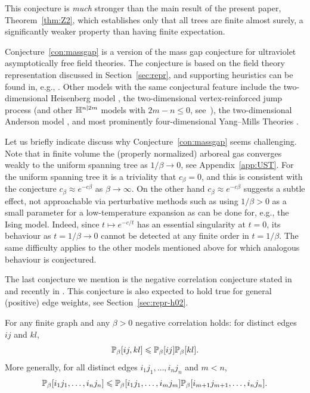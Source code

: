 \documentclass[11pt]{amsart}
\numberwithin{equation}{section}
\numberwithin{theorem}{section}
\begin{document}
This conjecture is \emph{much} stronger than the main result of
the present paper, Theorem~\ref{thm:Z2}, which establishes only that
all trees are finite almost surely, a significantly weaker property
than having finite expectation.

Conjecture~\ref{con:massgap} is a version of the mass
gap conjecture for ultraviolet asymptotically free field theories. The
conjecture is based on the field theory representation discussed in
Section~\ref{sec:repr}, and supporting heuristics can be found in,
e.g., \cite{MR2110547}.  Other models with the same conjectural
feature include the two-dimensional Heisenberg model
\cite{Polyakov75},   the two-dimensional vertex-reinforced jump process
\cite{MR2728731} (and other $\HH^{n|2m}$ models with $2m-n\leq  0$, see~\cite{1912.05817}), 
the two-dimensional Anderson model
\cite{PhysRevLett.42.673}, and most prominently four-dimensional
Yang--Mills Theories \cite{Polyakov75,MR2238278}.

Let us briefly indicate discuss why Conjecture~\ref{con:massgap} seems
challenging. Note that in finite volume the (properly normalized)
arboreal gas converges weakly to the uniform spanning tree as
$1/\beta \to 0$, see Appendix~\ref{app:UST}.  For the uniform spanning
tree it is a triviality that $c_{\beta}=0$, and this is consistent
with the conjecture $c_\beta \approx e^{-c\beta}$ as $\beta\to\infty$.
On the other hand $c_\beta \approx e^{-c\beta}$ suggests a subtle
effect, not approachable via perturbative methods such as using
$1/\beta>0$ as a small parameter for a low-temperature expansion as
can be done for, e.g., the Ising model.  Indeed, since
$t \mapsto e^{-c/t}$ has an essential singularity at $t=0$, its
behaviour as $t=1/\beta\to 0$ cannot be detected at any finite order
in $t=1/\beta$.  The same difficulty applies to the other models
mentioned above for which analogous behaviour is conjectured.

The last conjecture we mention is the negative correlation
conjecture stated in \cite{MR1757964,MR2060630,MR2724667} and recently in
\cite{1806.02675,1902.03719}. This conjecture is also expected to hold
true for general (positive) edge weights, see Section~\ref{sec:repr-h02}.

\begin{conjecture}
  \label{con:NA}
  For any finite graph and any $\beta>0$ negative correlation
  holds: for distinct edges $ij$ and $kl$,
  \begin{equation} \label{e:NA}
    \P_\beta[ij,kl] 
    \leq \P_\beta[ij] 
    \P_\beta[kl]. 
  \end{equation}
  More generally, for all distinct edges $i_1j_1, \dots, i_nj_n$ and $m<n$,
  \begin{equation}
    \P_\beta[i_1j_1,\dots, i_nj_n] \leq \P_\beta[i_1j_1,\dots, i_mj_m] 
    \P_\beta[i_{m+1}j_{m+1},\dots, i_nj_n].
  \end{equation}
\end{conjecture}
\end{document}

